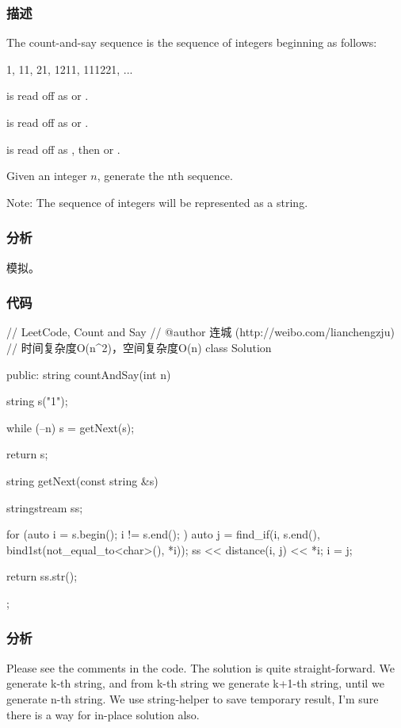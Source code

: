 \subsubsection{描述}
The count-and-say sequence is the sequence of integers beginning as follows:
\begin{Code}
1, 11, 21, 1211, 111221, ...
\end{Code}

 is read off as  or .

 is read off as  or .

 is read off as , then  or .

Given an integer $n$, generate the nth sequence.

Note: The sequence of integers will be represented as a string.


\subsubsection{分析}
模拟。


\subsubsection{代码}
\begin{Code}
// LeetCode, Count and Say
// @author 连城 (http://weibo.com/lianchengzju)
// 时间复杂度O(n^2)，空间复杂度O(n)
class Solution {
public:
    string countAndSay(int n) {
        string s("1");

        while (--n)
            s = getNext(s);

        return s;
    }

    string getNext(const string &s) {
        stringstream ss;

        for (auto i = s.begin(); i != s.end(); ) {
            auto j = find_if(i, s.end(), bind1st(not_equal_to<char>(), *i));
            ss << distance(i, j) << *i;
            i = j;
        }

        return ss.str();
    }
};
\end{Code}

\subsubsection{分析}
Please see the comments in the code. The solution is quite straight-forward. We generate k-th string, and from k-th string we generate k+1-th string, until we generate n-th string. We use string-helper to save temporary result, I'm sure there is a way for in-place solution also.


